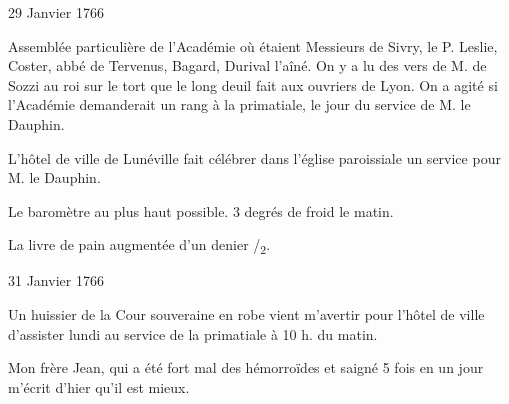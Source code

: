                      \begin{diary}{29 Janvier 1766}{}
                        
                         Assemblée particulière de l'Académie où étaient Messieurs
                           de Sivry, le P.
                              Leslie, Coster,
                              abbé
                              de Tervenus, Bagard, Durival
                           l'aîné. On
                           y a lu des vers de M. de Sozzi
                           au roi sur le
                           tort que le long deuil fait aux ouvriers de Lyon.
                           On a agité si l'Académie
                           demanderait un
                           rang à la primatiale,
                           le jour du service de
                           M. le Dauphin. \bigskip
        
        
                        
                           L'hôtel de ville de Lunéville fait célébrer
                           dans l’église
                              paroissiale un service pour M.
                              le Dauphin. \bigskip
        
        
                         Le baromètre au plus haut possible.
                           3 degrés de froid
                           le
                           matin. \bigskip
        
        
                         La livre de pain augmentée d'un denier
                              /\textsubscript{2}. \bigskip
        
        
                     \end{diary}

                     \begin{diary}{31 Janvier 1766}{}
                        
                         Un huissier de la Cour souveraine en robe vient
                           m'avertir pour l'hôtel de ville
                           d'assister lundi
                           au service de la
                              primatiale à 10 h. du matin. \bigskip
        
        
                        
                           Mon frère Jean, qui a été
                           fort mal des
                           hémorroïdes et saigné 5 fois en un jour
                           m'écrit d'hier qu'il est mieux. \bigskip
        
        
                     \end{diary}
